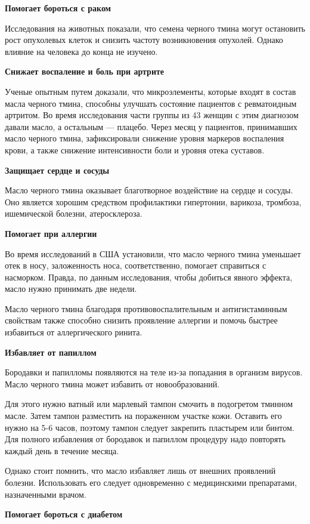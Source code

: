 \textbf{Помогает бороться с раком}

Исследования на животных показали, что семена черного тмина могут остановить рост опухолевых клеток и снизить частоту возникновения опухолей. Однако влияние на человека до конца не изучено.

\textbf{Снижает воспаление и боль при артрите}

Ученые опытным путем доказали, что микроэлементы, которые входят в состав масла черного тмина, способны улучшать состояние пациентов с ревматоидным артритом. Во время исследования части группы из 43 женщин с этим диагнозом давали масло, а остальным — плацебо. Через месяц у пациентов, принимавших масло черного тмина, зафиксировали снижение уровня маркеров воспаления крови, а также снижение интенсивности боли и уровня отека суставов.

\textbf{Защищает сердце и сосуды}

Масло черного тмина оказывает благотворное воздействие на сердце и сосуды. Оно является хорошим средством профилактики гипертонии, варикоза, тромбоза, ишемической болезни, атеросклероза.

\textbf{Помогает при аллергии}

Во время исследований в США установили, что масло черного тмина уменьшает отек в носу, заложенность носа, соответственно, помогает справиться с насморком. Правда, по данным исследования, чтобы добиться явного эффекта, масло нужно принимать две недели.

Масло черного тмина благодаря противовоспалительным и антигистаминным свойствам также способно снизить проявление аллергии и помочь быстрее избавиться от аллергического ринита.

\textbf{Избавляет от папиллом}

Бородавки и папилломы появляются на теле из-за попадания в организм вирусов. Масло черного тмина может избавить от новообразований.

Для этого нужно ватный или марлевый тампон смочить в подогретом тминном масле. Затем тампон разместить на пораженном участке кожи. Оставить его нужно на 5-6 часов, поэтому тампон следует закрепить пластырем или бинтом. Для полного избавления от бородавок и папиллом процедуру надо повторять каждый день в течение месяца.

Однако стоит помнить, что масло избавляет лишь от внешних проявлений болезни. Использовать его следует одновременно с медицинскими препаратами, назначенными врачом.

\textbf{Помогает бороться с диабетом}

